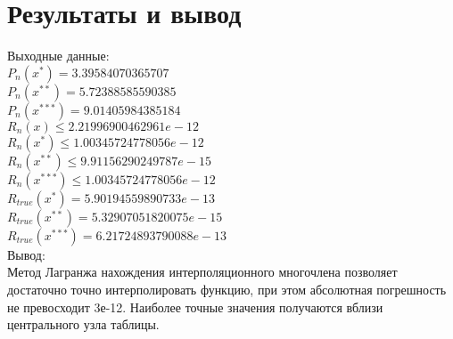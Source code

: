 \documentclass[10pt]{scrartcl}
\begin{document}
\section*{Результаты и вывод}\noindent
Выходные данные:\\
$P_n(x^*) = 3.39584070365707$\\
$P_n(x^{**}) = 5.72388585590385$\\
$P_n(x^{***})= 9.01405984385184$\\
$R_n(x) \leq 2.21996900462961e-12$\\
$R_n(x^*) \leq 1.00345724778056e-12$\\
$R_n(x^{**}) \leq 9.91156290249787e-15$\\
$R_n(x^{***}) \leq 1.00345724778056e-12$\\
$R_{true}(x^*) = 5.90194559890733e-13$\\
$R_{true}(x^{**}) = 5.32907051820075e-15$\\
$R_{true}(x^{***}) = 6.21724893790088e-13$\\
Вывод:\\
Метод Лагранжа нахождения интерполяционного многочлена позволяет достаточно точно интерполировать функцию, при этом абсолютная погрешность не превосходит 3е-12. Наиболее точные значения получаются вблизи центрального узла таблицы.
\end{document}
